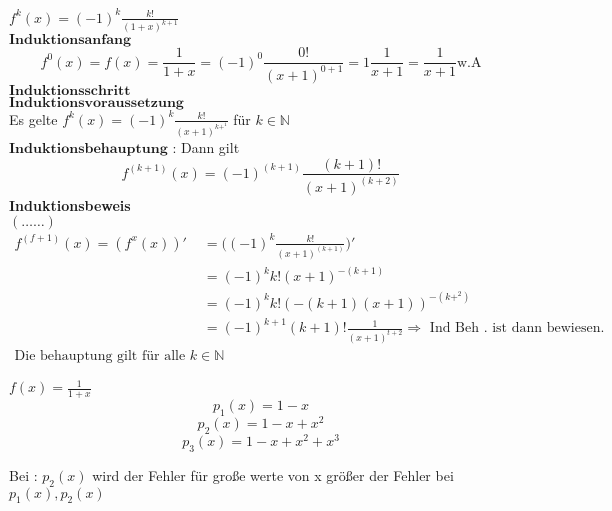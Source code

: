 \begin{example}
$f^k(x) = (-1)^k \frac{k!}{(1+x)^{k+1}}$\\
$\textbf{Induktionsanfang}$ 
\[ f^0(x) = f(x) = \frac{1}{1+x} = (-1)^0 \frac{0!}{(x+1)^{0+1}} = 1 \frac{1}{x+1} = \frac{1}{x+1} \text{w.A}\]
$\textbf{Induktionsschritt}$\\
$\textbf{Induktionsvoraussetzung}$\\
Es gelte $f^k(x)=(-1)^k\frac{k!}{(x +1)^{k+^1}}$ für $k \in \mathbb{N}$\\
$\textbf{Induktionsbehauptung}$ : Dann gilt \\
\[ f^{(k+1)}(x)= (-1)^{(k+1)} \frac{(k+1)!}{(x+1)^{(k+2)}}\]
\textbf{Induktionsbeweis}\\
$(\dots \dots)$\\
\begin{align*}
f^{(f+1)}(x) = (f^x(x))' &= \big((-1)^k \frac{k!}{(x+1)^{(k+1)}}\big )' \\
&= (-1)^k k! (x+1)^{-(k+1)}\\
&= (-1)^k k! (-(k+1)(x+1))^{-(k+^2)}\\
&= (-1)^{k+1} (k+1)! \frac{1}{(x+1)^{t+2}} \Rightarrow \text{ Ind Beh . ist dann bewiesen. }\\
\text{Die behauptung gilt für alle } k \in \mathbb{N}
\end{align*}
\end{example}
\begin{example}
$f(x)= \frac{1}{1+x}$ 
\[ p_1(x) = 1-x \]
\[ p_2(x) = 1-x + x^2 \]
\[ p_3(x) = 1-x+x^2+x^3 \]
\end{example}
\begin{remark}
Bei : $p_2(x)$ wird der Fehler für große werte von x größer der Fehler bei $p_1(x) , p_2(x)$
\end{remark}
